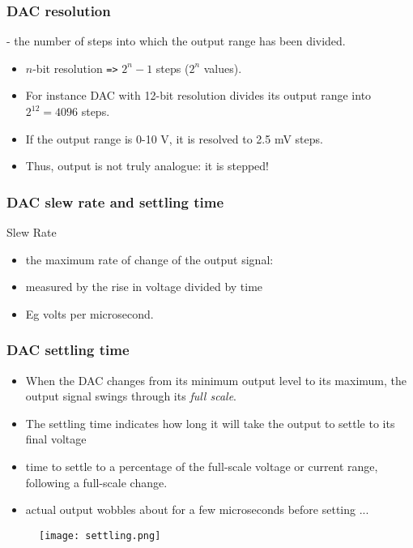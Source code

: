 \documentclass[10pt]{beamer}
\begin{document}
\begin{frame}
\frametitle{DAC resolution}
- the number of steps into which the output range has been divided.
\begin{itemize}
\item $n$-bit resolution \texttt{=>} $2^n - 1$ steps ($2^n$ values).
\item For instance DAC with 12-bit resolution divides its output range into $2^12 = 4096$ steps.
\item If the output range is 0-10 V, it is resolved to 2.5 mV steps.
\item Thus, output is not truly analogue: it is stepped!
\end{itemize}
\end{frame}

\begin{frame}
\frametitle{DAC slew rate and settling time}
Slew Rate
\begin{itemize}
\item the maximum rate of change of the output signal:
\item measured by the rise in voltage divided by time
\item Eg volts per microsecond.
\end{itemize}
\end{frame}

\begin{frame}
\frametitle{DAC settling time}
\begin{itemize}
\item When the DAC changes from its minimum output level to its maximum, the output signal swings through its \emph{full scale}.
\item The settling time indicates how long it will take the output to settle to
its final voltage
\item time to settle to a percentage of the full-scale voltage or current range, following a full-scale change.
\item actual output wobbles about for a few microseconds before setting ...
\end{itemize}

\begin{figure}[!htb]
\begin{center}
\texttt{[image: settling.png]}
\end{center}
\end{figure}
\end{frame}
\end{document}
